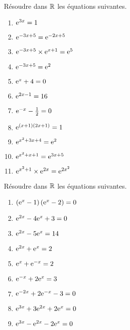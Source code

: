  
 
   \begin{exercice}
    Résoudre dans $ \mathbb{R} $  les équations suivantes.
  
\begin{enumerate}
\item $ \mathrm{e}^{3x}=1 $
\item $ \mathrm{e}^{-3x+5}=\mathrm{e}^{-2x+5} $
\item $ \mathrm{e}^{-3x+5}\times \mathrm{e}^{x+1}=\mathrm{e}^{5} $
\item $ \mathrm{e}^{-3x+5}=\mathrm{e}^{2} $
\item $ \mathrm{e}^{x}+4=0 $
\item  $  \mathrm{e}^{2x-1}=16 $ 
\item $ \mathrm{e}^{-x}-\frac{1}{2}=0 $
\item $\mathrm{e}^{\left(x+1\right)\left(2x+1\right)}=1 $  
\item $  \mathrm{e}^{x^{2}+3x+4}=\mathrm{e}^{2}$  
 \item $ \mathrm{e}^{x^{2}+x+1}=\mathrm{e}^{3x+5}$ 
 \item $ \mathrm{e}^{x^{2}+1}\times \mathrm{e}^{2x}=\mathrm{e}^{2x^{2}}$
  
\end{enumerate}

  \end{exercice}
  
  \begin{exercice}
Résoudre dans $ \mathbb{R} $  les équations suivantes.
   
\begin{enumerate}
\item   $\left(\mathrm{e}^{x}-1\right)\left(\mathrm{e}^{x}-2\right)=0 $ 
\item $ \mathrm{e}^{2x}-4\mathrm{e}^{x}+3=0$  
\item $ \mathrm{e}^{2x}-5\mathrm{e}^{x}=14$  
\item  $ \mathrm{e}^{2x}+\mathrm{e}^{x}=2 $  
\item $ \mathrm{e}^{x}+\mathrm{e}^{-x}=2$  
\item $ \mathrm{e}^{-x}+2\mathrm{e}^{x}=3$ 
\item $ \mathrm{e}^{-2x}+2\mathrm{e}^{-x}-3=0$
\item $ \mathrm{e}^{3x}+3\mathrm{e}^{2x}+2\mathrm{e}^{x}=0$ 
\item $ \mathrm{e}^{3x}-\mathrm{e}^{2x}-2\mathrm{e}^{x}=0$ 

\end{enumerate}
 \end{exercice}
 
